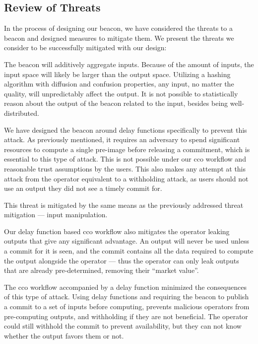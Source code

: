 \subsection{Review of Threats}
In the process of designing our beacon, we have considered the threats to a beacon and designed measures to mitigate them.
We present the threats we consider to be successfully mitigated with our design:

The beacon will additively aggregate inputs.
Because of the amount of inputs, the input space will likely be larger than the output space.
Utilizing a hashing algorithm with diffusion and confusion properties, any input, no matter the quality, will unpredictably affect the output.
It is not possible to statistically reason about the output of the beacon related to the input, besides being well-distributed.

We have designed the beacon around delay functions specifically to prevent this attack.
As previously mentioned, it requires an adversary to spend significant resources to compute a single pre-image before releasing a commitment, which is essential to this type of attack.
This is not possible under our \gls{cco} workflow and reasonable trust assumptions by the users.
This also makes any attempt at this attack from the operator equivalent to a withholding attack, as users should not use an output they did not see a timely commit for.

This threat is mitigated by the same means as the previously addressed threat mitigation --- input manipulation.

Our delay function based \gls{cco} workflow also mitigates the operator leaking outputs that give any significant advantage.
An output will never be used unless a commit for it is seen, and the commit contains all the data required to compute the output alongside the operator --- thus the operator can only leak outputs that are already pre-determined, removing their \enquote{market value}.

The \gls{cco} workflow accompanied by a delay function minimized the consequences of this type of attack.
Using delay functions and requiring the beacon to publish a commit to a set of inputs before computing, prevents malicious operators from pre-computing outputs, and withholding if they are not beneficial.
The operator could still withhold the commit to prevent availability, but they can not know whether the output favors them or not.

